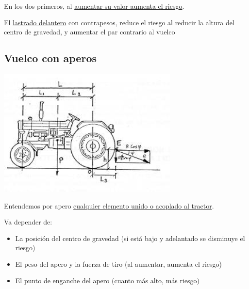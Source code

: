 \documentclass[a4paper,12pt,oneside]{book}
\begin{document}
En los dos primeros, al \uline{aumentar su valor aumenta el riesgo}.

El \uline{lastrado delantero} con contrapesos, reduce el riesgo al reducir la altura
del centro de gravedad, y aumentar el par contrario al vuelco

\subsection{Vuelco con aperos}
\label{sec:org1000d49}
\begin{center}
\includegraphics[width=.9\linewidth]{./img_0009/vuelco_aperos.PNG}
\end{center}

Entendemos por apero \uline{cualquier elemento unido o acoplado al tractor}.

Va depender de: 
\begin{itemize}
\item La posición del centro de gravedad (si está bajo y adelantado se disminuye
el riesgo)
\item El peso del apero y la fuerza de tiro (al aumentar, aumenta el riesgo)
\item El punto de enganche del apero (cuanto más alto, más riesgo)
\end{itemize}
\end{document}
